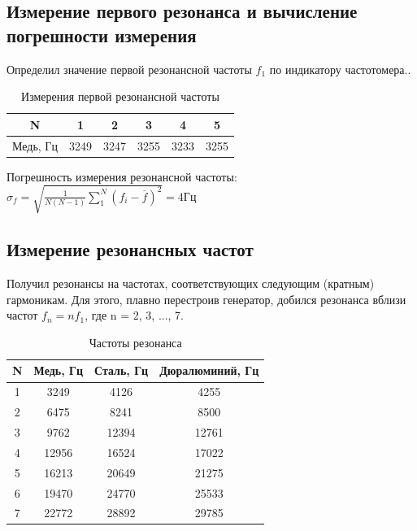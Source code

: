 \documentclass[a4paper]{article}
\begin{document}
\subsection{Измерение первого резонанса и вычисление погрешности измерения}

\item Определил значение первой резонансной частоты $f_1$ по индикатору
частотомера..

\begin{table}[h!]
\centering
\caption{Измерения первой резонансной частоты}
\begin{tabular}{|c|c|c|c|c|c|}
\hline
N & 1 &2 &3 &4 &5\\ \hline
Медь, Гц & 3249 & 3247 & 3255 & 3233 & 3255 \\ \hline
\end{tabular}
\end{table}

\item Погрешность измерения резонансной частоты: $\sigma_f = \sqrt{\frac{1}{N(N-1)}\sum_{1}^{N}(f_i-\overline{f})^2} = 4 Гц$


\subsection{Измерение резонансных частот}
\item Получил резонансы на частотах, соответствующих следующим
(кратным) гармоникам. Для этого, плавно перестроив генератор, добился резонанса вблизи частот $f_n = nf_1$, где n = 2, 3, ..., 7.

\begin{table}[h!]
\centering
\caption{Частоты резонанса}
\begin{tabular}{|c|c|c|c|}
\hline
N & Медь, Гц & Сталь, Гц & Дюралюминий, Гц \\ \hline
1 & 3249 & 4126 & 4255 \\ \hline
2 & 6475 & 8241 & 8500 \\ \hline
3 & 9762 & 12394 & 12761 \\ \hline
4 & 12956 & 16524 & 17022 \\ \hline
5 & 16213 & 20649 & 21275 \\ \hline
6 & 19470 & 24770 & 25533 \\ \hline
7 & 22772 & 28892 & 29785 \\ \hline
\end{tabular}
\end{table}
\end{document}
